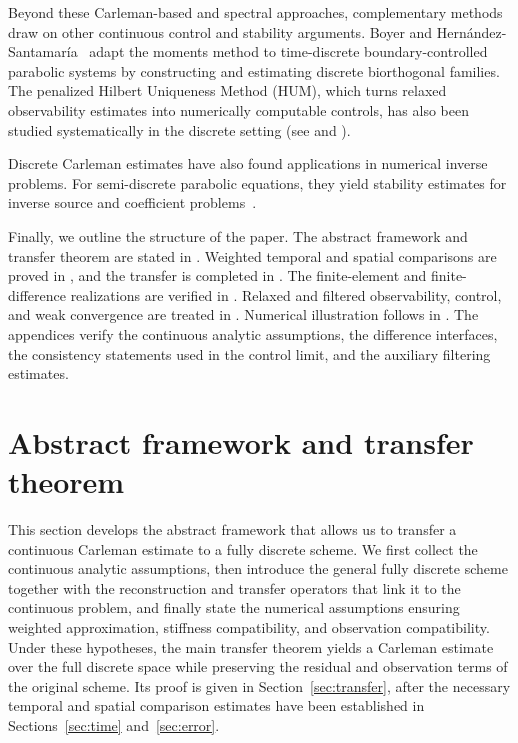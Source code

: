 \documentclass[print,wide,eng]{draft}
\begin{document}
Beyond these Carleman-based and spectral approaches, complementary methods draw on other continuous control and stability arguments. Boyer and Hern\'andez-Santamar\'ia~\cite{BoyerHernandezSantamaria2026} adapt the moments method to time-discrete boundary-controlled parabolic systems by constructing and estimating discrete biorthogonal families.
The penalized Hilbert Uniqueness Method (HUM), which turns relaxed observability estimates into numerically computable controls, has also been studied systematically in the discrete setting (see \cite[Sections~4--6]{BHLR11} and \cite{Boyer2013}).

Discrete Carleman estimates have also found applications in numerical inverse problems.
For semi-discrete parabolic equations, they yield stability estimates for inverse source and coefficient problems~\cite{Lecaros2025a}.

Finally, we outline the structure of the paper. The abstract framework and transfer theorem are stated in . Weighted temporal and spatial comparisons are proved in , and the transfer is completed in . The finite-element and finite-difference realizations are verified in . Relaxed and filtered observability, control, and weak convergence are treated in . Numerical illustration follows in . The appendices verify the continuous analytic assumptions, the difference interfaces, the consistency statements used in the control limit, and the auxiliary filtering estimates.



\section{Abstract framework and transfer theorem}\label{sec:interfaces}

This section develops the abstract framework that allows us to transfer a continuous Carleman estimate to a fully discrete scheme. We first collect the continuous analytic assumptions, then introduce the general fully discrete scheme together with the reconstruction and transfer operators that link it to the continuous problem, and finally state the numerical assumptions ensuring weighted approximation, stiffness compatibility, and observation compatibility. Under these hypotheses, the main transfer theorem yields a Carleman estimate over the full discrete space while preserving the residual and observation terms of the original scheme. Its proof is given in Section~\ref{sec:transfer}, after the necessary temporal and spatial comparison estimates have been established in Sections~\ref{sec:time} and~\ref{sec:error}.
\end{document}
